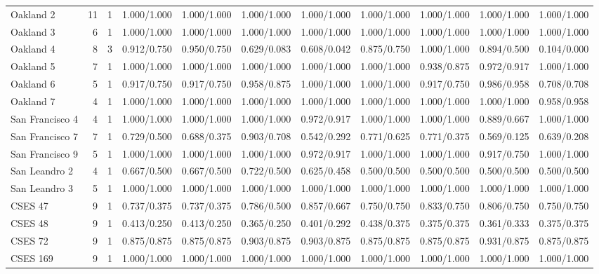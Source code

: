 \begin{longtable}{@{}lrrllllllll@{}}
Oakland 2 & 11 & 1 & 1.000/1.000 & 1.000/1.000 & 1.000/1.000 & 1.000/1.000 & 1.000/1.000 & 1.000/1.000 & 1.000/1.000 & 1.000/1.000\\
Oakland 3 & 6 & 1 & 1.000/1.000 & 1.000/1.000 & 1.000/1.000 & 1.000/1.000 & 1.000/1.000 & 1.000/1.000 & 1.000/1.000 & 1.000/1.000\\
Oakland 4 & 8 & 3 & 0.912/0.750 & 0.950/0.750 & 0.629/0.083 & 0.608/0.042 & 0.875/0.750 & 1.000/1.000 & 0.894/0.500 & 0.104/0.000\\
Oakland 5 & 7 & 1 & 1.000/1.000 & 1.000/1.000 & 1.000/1.000 & 1.000/1.000 & 1.000/1.000 & 0.938/0.875 & 0.972/0.917 & 1.000/1.000\\
Oakland 6 & 5 & 1 & 0.917/0.750 & 0.917/0.750 & 0.958/0.875 & 1.000/1.000 & 1.000/1.000 & 0.917/0.750 & 0.986/0.958 & 0.708/0.708\\
Oakland 7 & 4 & 1 & 1.000/1.000 & 1.000/1.000 & 1.000/1.000 & 1.000/1.000 & 1.000/1.000 & 1.000/1.000 & 1.000/1.000 & 0.958/0.958\\
San Francisco 4 & 4 & 1 & 1.000/1.000 & 1.000/1.000 & 1.000/1.000 & 0.972/0.917 & 1.000/1.000 & 1.000/1.000 & 0.889/0.667 & 1.000/1.000\\
San Francisco 7 & 7 & 1 & 0.729/0.500 & 0.688/0.375 & 0.903/0.708 & 0.542/0.292 & 0.771/0.625 & 0.771/0.375 & 0.569/0.125 & 0.639/0.208\\
San Francisco 9 & 5 & 1 & 1.000/1.000 & 1.000/1.000 & 1.000/1.000 & 0.972/0.917 & 1.000/1.000 & 1.000/1.000 & 0.917/0.750 & 1.000/1.000\\
San Leandro 2 & 4 & 1 & 0.667/0.500 & 0.667/0.500 & 0.722/0.500 & 0.625/0.458 & 0.500/0.500 & 0.500/0.500 & 0.500/0.500 & 0.500/0.500\\
San Leandro 3 & 5 & 1 & 1.000/1.000 & 1.000/1.000 & 1.000/1.000 & 1.000/1.000 & 1.000/1.000 & 1.000/1.000 & 1.000/1.000 & 1.000/1.000\\
CSES 47 & 9 & 1 & 0.737/0.375 & 0.737/0.375 & 0.786/0.500 & 0.857/0.667 & 0.750/0.750 & 0.833/0.750 & 0.806/0.750 & 0.750/0.750\\
CSES 48 & 9 & 1 & 0.413/0.250 & 0.413/0.250 & 0.365/0.250 & 0.401/0.292 & 0.438/0.375 & 0.375/0.375 & 0.361/0.333 & 0.375/0.375\\
CSES 72 & 9 & 1 & 0.875/0.875 & 0.875/0.875 & 0.903/0.875 & 0.903/0.875 & 0.875/0.875 & 0.875/0.875 & 0.931/0.875 & 0.875/0.875\\
CSES 169 & 9 & 1 & 1.000/1.000 & 1.000/1.000 & 1.000/1.000 & 1.000/1.000 & 1.000/1.000 & 1.000/1.000 & 1.000/1.000 & 1.000/1.000\\

\end{longtable}
